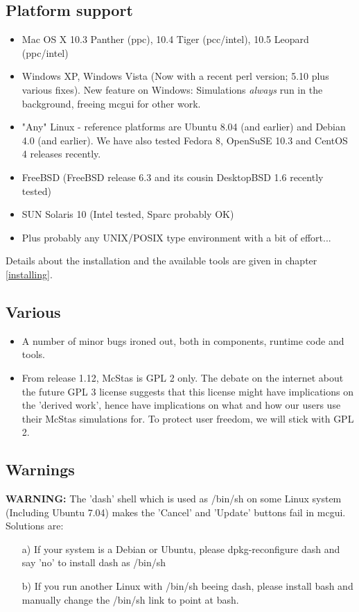 \subsection{Platform support}
\begin{itemize}
\item Mac OS X 10.3 Panther (ppc), 10.4 Tiger (pcc/intel), 10.5 Leopard (ppc/intel)
\item Windows XP,  Windows Vista (Now with a recent perl version; 5.10 plus various fixes). New feature on Windows:
     Simulations \emph{always} run in the background, freeing mcgui for other work.
\item "Any" Linux - reference platforms are Ubuntu 8.04 (and earlier) and Debian 4.0 (and earlier). We have also tested 
  Fedora 8, OpenSuSE 10.3 and CentOS 4 releases recently.
\item FreeBSD (FreeBSD release 6.3 and its cousin DesktopBSD 1.6 recently tested)
\item SUN Solaris 10 (Intel tested, Sparc probably OK)
\item Plus probably any UNIX/POSIX type environment with a bit of effort...
\end{itemize}
Details about the installation and the available tools are given in chapter \ref{installing}.

\subsection{Various}
\begin{itemize}
\item  A number of minor bugs ironed out, both in components, runtime code and tools.
\item From release 1.12, McStas is GPL 2 only. The debate on the internet about the future GPL 3 license suggests that this license 
     might have implications on the 'derived work', hence have implications on what and how our users use their McStas simulations
     for. To protect user freedom, we will stick with GPL 2.     
\end{itemize}

\subsection{Warnings}
{\bf WARNING:} The 'dash' shell which is used as /bin/sh on some Linux system (Including Ubuntu 7.04) makes the 'Cancel' and 'Update' 
buttons fail in mcgui. Solutions are:
\begin{itemize}
\item[a)] If your system is a Debian or Ubuntu, please dpkg-reconfigure dash and say 'no' to install dash as /bin/sh
\item[b)] If you run another Linux with /bin/sh beeing dash, please install bash and manually change the /bin/sh link to point at bash.
\end{itemize}


